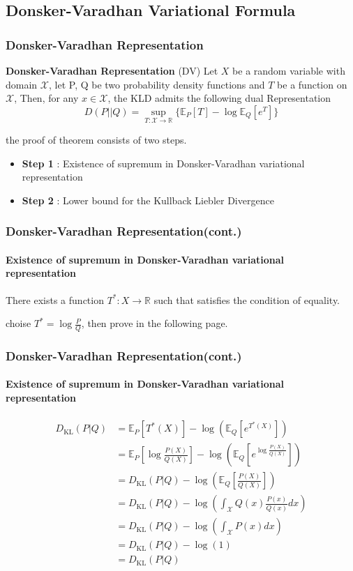 \documentclass{beamer}
\begin{document}
\subsection{Donsker-Varadhan Variational Formula}
	\begin{frame}
		\frametitle{Donsker-Varadhan Representation}
		\begin{theorem}
			\textbf{Donsker-Varadhan Representation} (DV)
			Let $X$ be a random variable with domain $\mathcal{X}$, let P, Q be two probability density functions
			and $T$ be a function on $\mathcal{X}$, 
			Then, for any $x \in \mathcal{X}$, the KLD admits the following dual Representation
			\begin{equation*}
				D(P || Q) = \sup_{T:\mathcal{X} \rightarrow \mathbb{R}} \{ \mathbb{E}_P[T] - \log \mathbb{E}_Q[e^{T}]\}
			\end{equation*}
		\end{theorem}
		the proof of theorem consists of two steps.
		\begin{itemize}
			\item \textbf{Step 1} : Existence of supremum in Donsker-Varadhan variational representation
			\item \textbf{Step 2} : Lower bound for the Kullback Liebler Divergence
		\end{itemize}	
	\end{frame}

	\begin{frame}
		\frametitle{Donsker-Varadhan Representation(cont.)}
		\framesubtitle{Existence of supremum in Donsker-Varadhan variational representation}
		\begin{lemma}
			There exists a function $T^*: X \rightarrow \mathbb{R}$ such that satisfies the condition of equality.
		\end{lemma}
		choise $T^* = \log\frac{P}{Q}$, then prove in the following page.
	\end{frame}


	\begin{frame}
		\frametitle{Donsker-Varadhan Representation(cont.)}
		\framesubtitle{Existence of supremum in Donsker-Varadhan variational representation}
		\begin{align}
			D_{\text{KL}}(P|Q) &= \mathbb{E}_P[T^*(X)] - \log(\mathbb{E}_Q[e^{T^*(X)}])\\			
			&= \mathbb{E}_P [\log \frac{P(X)}{Q(X)}]-\log(\mathbb{E}_Q[e^{\log\frac{P(X)}{Q(X)}}])\\
			&= D_{\text{KL}}(P|Q) - \log(\mathbb{E}_Q[\frac{P(X)}{Q(X)}])\\
			&= D_{\text{KL}}(P|Q) - \log(\int_{\mathcal{X}} Q(x)\frac{P(x)}{Q(x)}dx)\\
			&= D_{\text{KL}}(P|Q) - \log(\int_{\mathcal{X}} P(x)dx)\\
			&= D_{\text{KL}}(P|Q) - \log(1)\\
			&= D_{\text{KL}}(P|Q)
		\end{align}
	\end{frame}
\end{document}

